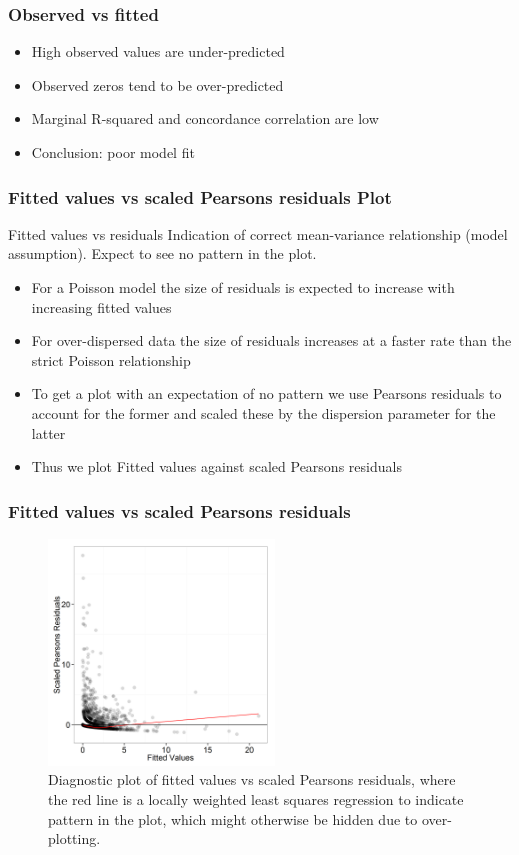 \begin{frame}
\frametitle{Observed vs fitted}
\begin{itemize}
\item High observed values are under-predicted
\item Observed zeros tend to be over-predicted
\item Marginal R-squared and concordance correlation are low
\pause
\bigskip
\item Conclusion: poor model fit
\end{itemize}
\end{frame}


\begin{frame}[fragile]
\frametitle{Fitted values vs scaled Pearsons residuals Plot}

\begin{block}{Fitted values vs residuals}
Indication of correct mean-variance relationship (model assumption).  Expect to see no pattern in the plot.  
\end{block}

\begin{itemize}
\item For a Poisson model the size of residuals is expected to increase with increasing fitted values
\item For over-dispersed data the size of residuals increases at a faster rate than the strict Poisson relationship
\item To get a plot with an expectation of no pattern we use Pearsons residuals to account for the former and scaled these by the dispersion parameter for the latter
\item Thus we plot Fitted values against scaled Pearsons residuals
\end{itemize}
\end{frame}

\begin{frame}[fragile]
\frametitle{Fitted values vs scaled Pearsons residuals}
\begin{figure}[h]
  \centering
    \includegraphics[width=6cm]{FitPlots_resids.png}
  \caption{Diagnostic plot of fitted values vs scaled Pearsons residuals, where the red line is a locally weighted least squares regression to indicate pattern in the plot, which might otherwise be hidden due to over-plotting.}
  \label{fig:diagplots}
\end{figure}
\end{frame}

